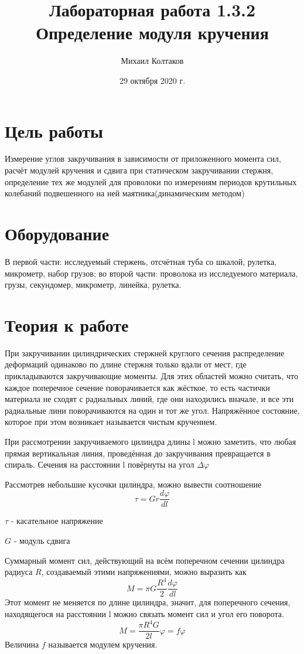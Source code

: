 \documentclass[a4paper, 12pt]{article}
\title{Лабораторная работа 1.3.2 Определение модуля кручения}
\author{Михаил Колтаков}
\date{29 октября 2020 г.}
\begin{document}
	\maketitle
	\section*{Цель работы}
		Измерение углов закручивания в зависимости от приложенного момента сил, расчёт модулей кручения и сдвига при статическом закручивании стержня, определение тех же модулей для проволоки по измерениям периодов крутильных колебаний подвешенного на ней маятника(динамическим методом)
	\section*{Оборудование}
		В первой части: исследуемый стержень, отсчётная туба со шкалой, рулетка, микрометр, набор грузов;
		во второй части: проволока из исследуемого материала, грузы, секундомер, микрометр, линейка, рулетка.
	\section*{Теория к работе}
		При закручивании цилиндрических стержней круглого сечения распределение деформаций одинаково по длине стержня только вдали от мест, где прикладываются закручивающие моменты. Для этих областей можно считать, что каждое поперечное сечение поворачивается как жёсткое, то есть частички материала не сходят с радиальных линий, где они находились вначале, и все эти радиальные лини поворачиваются на один и тот же угол. Напряжённое состояние, которое при этом возникает называется чистым кручением.
		
		При рассмотрении закручиваемого цилиндра длины l можно заметить, что любая прямая вертикальная линия, проведённая до закручивания превращается в спираль. Сечения на расстоянии l повёрнуты на угол $\Delta \varphi $
		
		Рассмотрев небольшие кусочки цилиндра, можно вывести соотношение
		$$ \tau = Gr \frac{d \varphi}{dl}$$
		
		$\tau$ - касательное напряжение
		
		$G$ - модуль сдвига
		
		Суммарный момент сил, действующий на всём поперечном сечении цилиндра радиуса $R$, создаваемый этими напряжениями, можно выразить как
		$$M=\pi G \frac{R^4}{2} \frac{d \varphi}{dl} $$
		Этот момент не меняется по длине цилиндра, значит, для поперечного сечения, находящегося на расстоянии l можно связать момент сил и угол его поворота.
		$$M = \frac{\pi R^4 G}{2l} \varphi = f \varphi$$
		Величина $f$ называется модулем кручения.
\end{document}
